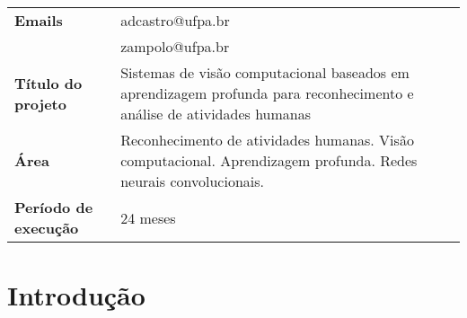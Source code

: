 \begin{table}[!th]
\begin{tabular}{|l p{}|}
\textbf{Emails}               & adcastro@ufpa.br\\
	                      & zampolo@ufpa.br\\
\textbf{Título do projeto}    & Sistemas de visão computacional baseados em aprendizagem profunda para reconhecimento e análise de atividades humanas\\
\textbf{Área}                 & Reconhecimento de atividades humanas. Visão computacional. Aprendizagem profunda. Redes neurais convolucionais.\\
\textbf{Período de execução}  & 24 meses\\
\hline
\end{tabular}
\end{table}
\newpage

\tableofcontents\newpage


\begin{abstract}
%
\end{abstract}

\section{Introdução}
\label{sec:intro}
%

%

%

